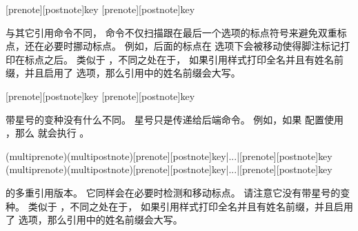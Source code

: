 \begin{ltxsyntax}

[prenote][postnote]{key}
[prenote][postnote]{key}


与其它引用命令不同， 命令不仅扫描跟在最后一个选项的标点符号来避免双重标点，还在必要时挪动标点。
例如，后面的标点在  选项下会被移动使得脚注标记打印在标点之后。
 类似于 ，不同之处在于，
如果引用样式打印全名并且有姓名前缀，并且启用了  选项，那么引用中的姓名前缀会大写。

[prenote][postnote]{key}
[prenote][postnote]{key}


 带星号的变种没有什么不同。
星号只是传递给后端命令。
例如，如果  配置使用 ，那么  就会执行 。

(multiprenote)(multipostnote)[prenote][postnote]{key}|...|[prenote][postnote]{key}
(multiprenote)(multipostnote)[prenote][postnote]{key}|...|[prenote][postnote]{key}


 的多重引用版本。
它同样会在必要时检测和移动标点。
请注意它没有带星号的变种。
 类似于 ，不同之处在于，
如果引用样式打印全名并且有姓名前缀，并且启用了  选项，那么引用中的姓名前缀会大写。

\end{ltxsyntax}

